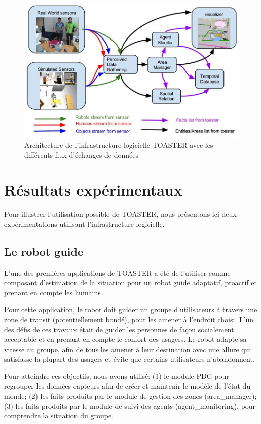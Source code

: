 \documentclass[a4paper,11pt,twoside]{StyleThese}
\begin{document}
\begin{figure}[ht!]
 \centering
  \includegraphics[width=0.99\linewidth]{./img/toasterArch.jpg} 
  \caption {Architecture de l'infrastructure logicielle TOASTER avec les différents flux d'échanges de données}
  \label{fig:toasterArch}
\end{figure}

\section{Résultats expérimentaux}
Pour illustrer l'utilisation possible de TOASTER, nous présentons ici deux expérimentations utilisant l'infrastructure logicielle.

\subsection{Le robot guide}

L'une des premières applications de TOASTER a été de l'utiliser comme composant d'estimation de la situation pour un robot guide adaptatif, proactif et prenant en compte les humains \cite{fioreicsr2015}.

Pour cette application, le robot doit guider un groupe d'utilisateurs à travers une zone de transit (potentiellement bondé), pour les amener à l'endroit choisi.
L'un des défis de ces travaux était de guider les personnes de façon socialement acceptable et en prenant en compte le confort des usagers.
Le robot adapte sa vitesse au groupe, afin de tous les amener à leur destination avec une allure qui satisfasse la plupart des usagers et évite que certains utilisateurs n'abandonnent.

Pour atteindre ces objectifs, nous avons utilisé: (1) le module PDG pour regrouper les données capteurs afin de créer et maintenir le modèle de l'état du monde; (2) les faits produits par le module de gestion des zones (area\_manager); (3) les faits produits par le module de suivi des agents (agent\_monitoring), pour comprendre la situation du groupe. 
\end{document}
